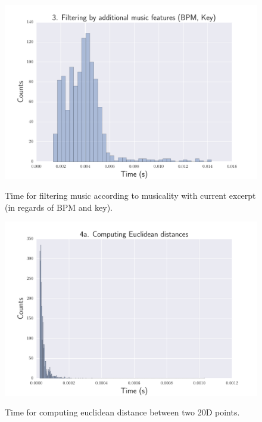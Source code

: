 \begin{figure}[htbp]
\begin{center}
\includegraphics[scale=0.7]{Figures/bench_bpm_filters.pdf}
  \caption[Time for filtering music according to musicality with current excerpt]{Time for filtering music according to musicality with current excerpt (in regards of BPM and key).}
  \label{fig:step3}
\vspace{2cm}
\includegraphics[scale=0.7]{Figures/bench_euclidean.pdf}
  \caption[Time for computing euclidean distance]{Time for computing euclidean distance between two 20D points.}
  \label{fig:step4}
\end{center}
\end{figure}


